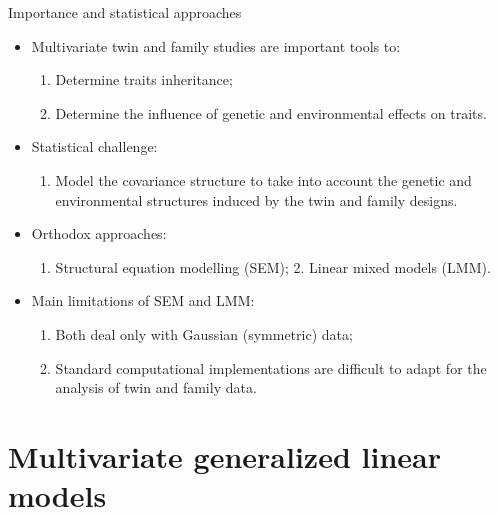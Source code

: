 \documentclass[
  ignorenonframetext,
  serif,
  professionalfont,
  usenames,
  dvipsnames,
  aspectratio = 169]{beamer}
\providecommand{\tightlist}{%
  \setlength{\itemsep}{0pt}\setlength{\parskip}{0pt}}
\renewcommand{\tightlist}{%
  \setlength{\itemsep}{0\baselineskip}
  \setlength{\parskip}{0.25\baselineskip}
}
\begin{document}
\begin{frame}{Importance and statistical approaches}
\protect\hypertarget{importance-and-statistical-approaches}{}
\begin{itemize}
\tightlist
\item
  Multivariate twin and family studies are important tools to:

  \begin{enumerate}
  \tightlist
  \item
    Determine traits inheritance;
  \item
    Determine the influence of genetic and environmental effects on
    traits.
  \end{enumerate}
\item
  Statistical challenge:

  \begin{enumerate}
  \tightlist
  \item
    Model the covariance structure to take into account the genetic and
    environmental structures induced by the twin and family designs.
  \end{enumerate}
\item
  Orthodox approaches:

  \begin{enumerate}
  \tightlist
  \item
    Structural equation modelling (SEM); 2. Linear mixed models (LMM).
  \end{enumerate}
\item
  Main limitations of SEM and LMM:

  \begin{enumerate}
  \tightlist
  \item
    Both deal only with Gaussian (symmetric) data;
  \item
    Standard computational implementations are difficult to adapt for
    the analysis of twin and family data.
  \end{enumerate}
\end{itemize}
\end{frame}

\hypertarget{multivariate-generalized-linear-models}{%
\section{Multivariate generalized linear
models}\label{multivariate-generalized-linear-models}}
\end{document}
